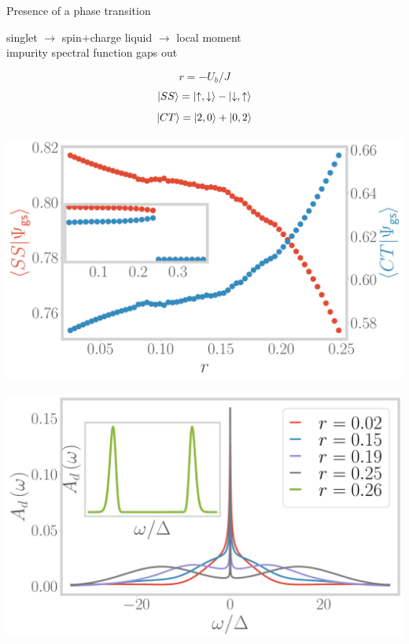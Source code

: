 \documentclass[8pt,aspectratio=169]{beamer}
\begin{document}
\begin{frame}{Presence of a phase transition}

\begin{minipage}{0.7\textwidth}
singlet {\LARGE \(\longrightarrow\)} spin+charge liquid {\LARGE \(\longrightarrow\)} local moment\\[10pt]
impurity spectral function gaps out
\end{minipage}
\begin{minipage}{0.29\textwidth}
\[r = -U_b/J\]
\[\ket{SS} = \ket{\uparrow,\downarrow} - \ket{\downarrow,\uparrow}\]
\[\ket{CT} = \ket{2,0} + \ket{0,2}\]
\end{minipage}

\vspace*{\fill}

\begin{minipage}{0.49\textwidth}
	\includegraphics[width=\textwidth]{corrs_gs.pdf}
\end{minipage}
\hspace*{\fill}
\begin{minipage}{0.49\textwidth}
	\includegraphics[width=\textwidth]{Add.pdf}
\end{minipage}
\end{frame}
\end{document}
